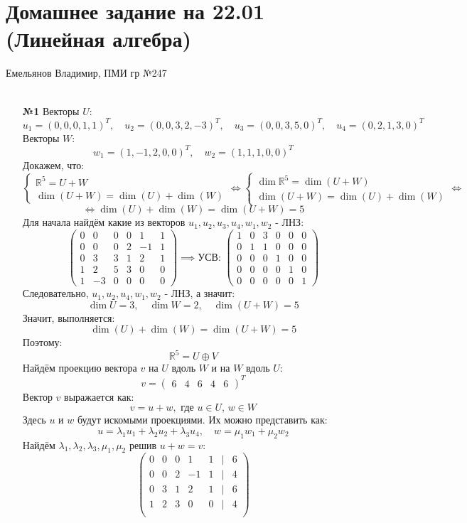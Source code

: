 \documentclass[a4paper]{article}
\newcommand{\mat}[1]{\begin{pmatrix} #1 \end{pmatrix}}
\newcommand{\case}[1]{\begin{cases} #1 \end{cases}}
\newcommand{\lr}{\Leftrightarrow}
\newcommand{\RR}{\mathbb{R}}
\begin{document}
\section*{Домашнее задание на 22.01 (Линейная алгебра)}
 {\large Емельянов Владимир, ПМИ гр №247}\\\\
\begin{enumerate}
    \item[\textbf{№1}]Векторы $U$:
    $$
    u_1 = (0,0,0,1,1)^{T}, \quad u_2 = (0,0,3,2,-3)^{T}, \quad u_3 = (0,0,3,5,0)^{T}, \quad u_4 = (0,2,1,3,0)^{T}
    $$
    Векторы $W$:
    $$
    w_1 = (1,-1,2,0,0)^{T}, \quad w_2 = (1,1,1,0,0)^{T}
    $$
    Докажем, что:
    $$\case{
        \RR^5 = U + W\\
        \dim(U + W) = \dim(U) + \dim(W)
    } \lr \case{
        \dim \RR^5 = \dim(U+W)\\
        \dim(U + W) = \dim(U) + \dim(W)
    } \lr$$
    $$\lr \dim(U) + \dim(W) = \dim(U + W) = 5$$
    Для начала найдём какие из векторов $u_1, u_2, u_3, u_4, w_1, w_2$ - ЛНЗ:
    $$\mat{0 & 0 &0 & 0&1& 1\\
    0 & 0 & 0 & 2 & -1&1\\
    0 & 3 &3  & 1 & 2&1\\
    1 & 2 & 5 & 3 & 0&0\\
    1& -3 & 0 & 0 & 0&0} \implies \text{УСВ: } \mat{1 & 0 & 3 & 0 & 0 & 0 \\
    0 & 1 & 1 & 0 & 0 & 0 \\
    0 & 0 & 0 & 1 & 0 & 0 \\
    0 & 0 & 0 & 0 & 1 & 0 \\
    0 & 0 & 0 & 0 & 0 & 1}$$
    Следовательно, $u_1, u_2, u_4, w_1, w_2$ - ЛНЗ, а значит:
    $$\dim U = 3, \quad \dim W = 2, \quad \dim(U + W) = 5$$
    Значит, выполняется:
    $$\dim(U) + \dim(W) = \dim(U + W) = 5$$
    Поэтому:
    $$\RR^5 = U \oplus V$$
    Найдём проекцию вектора $v$ на $U$ вдоль $W$ и на $W$ вдоль $U$:
    $$v = \mat{6&4&6&4&6}^T$$
    Вектор $v$ выражается как:
    $$v = u + w, \text{ где $u \in U$, $w \in W$}$$
    Здесь $u$ и $w$ будут искомыми проекциями. Их можно представить как:
    $$u = \lambda_1 u_1 + \lambda_2 u_2 + \lambda_3 u_4, \quad w = \mu_1 w_1 + \mu_2w_2$$
    Найдём $\lambda_1, \lambda_2, \lambda_3, \mu_1, \mu_2$ решив $u+w = v$:
    $$\mat{0 & 0  & 0&1& 1 & | & 6\\
    0 & 0 & 2 & -1&1 & | & 4\\
    0 & 3 & 1 & 2&1 & | & 6\\
    1 & 2 & 3 & 0&0 & | & 4\\
}$$
\end{enumerate}
\end{document}
